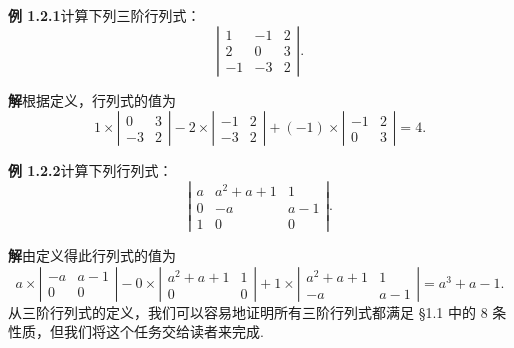 \documentclass[UTF8,12pt,a4paper,fontset=fandol]{ctexart}
\begin{document}
\noindent\textbf{例 1.2.1}\quad 计算下列三阶行列式：
\[
\left|\begin{array}{ccc}
1 & -1 & 2\\
2 & 0 & 3\\
-1 & -3 & 2
\end{array}\right|.
\]

\noindent\textbf{解}\quad 根据定义，行列式的值为
\[
1\times
\left|\begin{array}{cc}
0 & 3\\
-3 & 2
\end{array}\right|
-2\times
\left|\begin{array}{cc}
-1 & 2\\
-3 & 2
\end{array}\right|
+(-1)\times
\left|\begin{array}{cc}
-1 & 2\\
0 & 3
\end{array}\right|
=4.
\]

\noindent\textbf{例 1.2.2}\quad 计算下列行列式：
\[
\left|\begin{array}{ccc}
a & a^2+a+1 & 1\\
0 & -a & a-1\\
1 & 0 & 0
\end{array}\right|.
\]

\noindent\textbf{解}\quad 由定义得此行列式的值为
\[
a\times
\left|\begin{array}{cc}
-a & a-1\\
0 & 0
\end{array}\right|
-0\times
\left|\begin{array}{cc}
a^2+a+1 & 1\\
0 & 0
\end{array}\right|
+1\times
\left|\begin{array}{cc}
a^2+a+1 & 1\\
-a & a-1
\end{array}\right|
=a^3+a-1.
\]
从三阶行列式的定义，我们可以容易地证明所有三阶行列式都满足 §1.1 中的 8 条性质，但我们将这个任务交给读者来完成.
\end{document}
